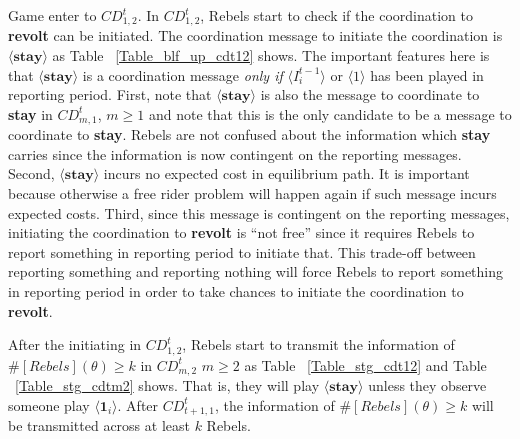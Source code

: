 \documentclass[12pt,letter]{article}
\theoremstyle{definition}
\theoremstyle{remark}
\theoremstyle{claim}
\begin{document}
Game enter to $CD^t_{1,2}$. In $CD^t_{1,2}$, Rebels start to check if the coordination to \textbf{revolt} can be initiated. The coordination message to initiate the coordination is $\langle \textbf{stay} \rangle$ as Table ~\ref{Table_blf_up_cdt12} shows. The important features here is that $\langle \textbf{stay} \rangle$ is a coordination message \textit{only if} $\langle  {I^{t-1}_i} \rangle$ or $\langle 1 \rangle$ has been played in reporting period.  First, note that $\langle \textbf{stay} \rangle$ is also the message to coordinate to \textbf{stay} in $CD^t_{m,1}$, $m\geq 1$ and note that this is the only candidate to be a message to coordinate to \textbf{stay}. Rebels are not confused about the information which \textbf{stay} carries since the information is now contingent on the reporting messages. Second, $\langle \textbf{stay} \rangle$ incurs no expected cost in equilibrium path. It is important because otherwise a free rider problem will happen again if such message incurs expected costs. Third, since this message is contingent on the reporting messages, initiating the coordination to \textbf{revolt} is ``not free'' since it requires Rebels to report something in reporting period to initiate that. This trade-off between reporting something and reporting nothing will force Rebels to report something in reporting period in order to take chances to initiate the coordination to \textbf{revolt}.

After the initiating in $CD^t_{1,2}$, Rebels start to transmit the information of $\#[Rebels](\theta)\geq k$ in $CD^t_{m,2}$ $m\geq 2$ as Table ~\ref{Table_stg_cdt12} and Table ~\ref{Table_stg_cdtm2} shows. That is, they will play $\langle \textbf{stay} \rangle$ unless they observe someone play $\langle \mathbf{1}_i \rangle$. After $CD^t_{{t+1},1}$, the information of $\#[Rebels](\theta)\geq k$ will be transmitted across at least $k$ Rebels. 
\end{document}
